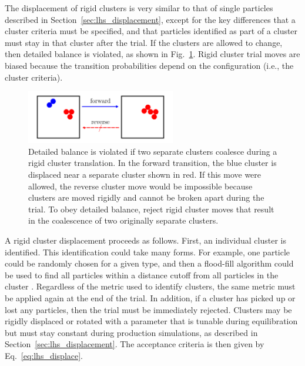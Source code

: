 \documentclass[
  9pt,
  bestpractices,
]{livecoms}
\begin{document}
The displacement of rigid clusters is very similar to that of single particles described in Section~\ref{sec:lhs_displacement}, except for the key differences that a cluster criteria must be specified, and that particles identified as part of a cluster must stay in that cluster after the trial.
If the clusters are allowed to change, then detailed balance is violated, as shown in Fig.~\ref{fig:cluster}.
Rigid cluster trial moves are biased because the transition probabilities depend on the configuration (i.e., the cluster criteria).

\begin{figure}
\begin{centering}
\includegraphics[width=6.5cm]{../figures/cluster.png}
\caption{
Detailed balance is violated if two separate clusters coalesce during a rigid cluster translation.
In the forward transition, the blue cluster is displaced near a separate cluster shown in red.
If this move were allowed, the reverse cluster move would be impossible because clusters are moved rigidly and cannot be broken apart during the trial.
To obey detailed balance, reject rigid cluster moves that result in the coalescence of two originally separate clusters.
}
\label{fig:cluster}
\end{centering}
\end{figure}

A rigid cluster displacement proceeds as follows.
First, an individual cluster is identified.
This identification could take many forms.
For example, one particle could be randomly chosen for a given type, and then a flood-fill algorithm could be used to find all particles within a distance cutoff from all particles in the cluster \cite{hatch_self-assembly_2016}.
Regardless of the metric used to identify clusters, the same metric must be applied again at the end of the trial.
In addition, if a cluster has picked up or lost any particles, then the trial must be immediately rejected.
Clusters may be rigidly displaced or rotated with a parameter that is tunable during equilibration but must stay constant during production simulations, as described in Section~\ref{sec:lhs_displacement}.
The acceptance criteria is then given by Eq.~\ref{eq:lhs_displace}.

\end{document}
